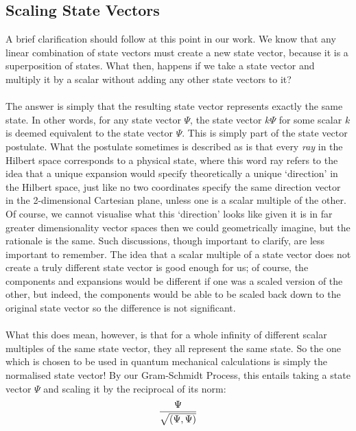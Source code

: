 \subsection{Scaling State Vectors}
A brief clarification should follow at this point in our work. We know that any linear combination of state vectors must create a new state vector, because it is a superposition of states. What then, happens if we take a state vector and multiply it by a scalar without adding any other state vectors to it? 
\\\\
The answer is simply that the resulting state vector represents exactly the same state. In other words, for any state vector $\Psi$, the state vector $k\Psi$ for some scalar $k$ is deemed equivalent to the state vector $\Psi$. This is simply part of the state vector postulate. What the postulate sometimes is described as is that every \textit{ray} in the Hilbert space corresponds to a physical state, where this word ray refers to the idea that a unique expansion would specify theoretically a unique `direction' in the Hilbert space, just like no two coordinates specify the same direction vector in the 2-dimensional Cartesian plane, unless one is a scalar multiple of the other. Of course, we cannot visualise what this `direction' looks like given it is in far greater dimensionality vector spaces then we could geometrically imagine, but the rationale is the same. Such discussions, though important to clarify, are less important to remember. The idea that a scalar multiple of a state vector does not create a truly different state vector is good enough for us; of course, the components and expansions would be different if one was a scaled version of the other, but indeed, the components would be able to be scaled back down to the original state vector so the difference is not significant.
\\\\
What this does mean, however, is that for a whole infinity of different scalar multiples of the same state vector, they all represent the same state. So the one which is chosen to be used in quantum mechanical calculations is simply the normalised state vector! By our Gram-Schmidt Process, this entails taking a state vector $\Psi$ and scaling it by the reciprocal of its norm:
$$
\frac{\Psi}{\sqrt{\left(\Psi,\Psi\right)}}
$$
